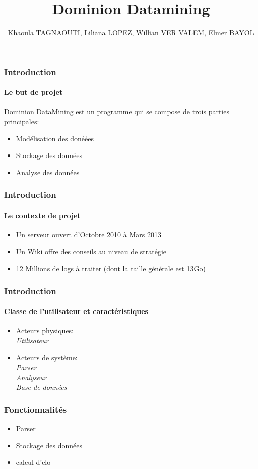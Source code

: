 \documentclass{beamer}
\title{Dominion Datamining}
\author[TAGNAOUTI, LOPEZ, VER VALEM, BAYOL]{Khaoula TAGNAOUTI, Liliana LOPEZ, Willian VER VALEM, Elmer BAYOL}
\begin{document}
\maketitle


\begin{frame}
  \frametitle{Introduction}
  \framesubtitle{Le but de projet}
  Dominion DataMining est un programme qui se compose de trois parties principales:
  \begin{itemize}
  \item Modélisation des donéées
  \item Stockage des données
  \item Analyse des données
  \end{itemize}
\end{frame}

\begin{frame}
  \frametitle{Introduction}
  \framesubtitle{Le contexte de projet}
  
  \begin{itemize}
    \item Un serveur ouvert d'Octobre 2010 à Mars 2013
    \item Un Wiki offre des conseils au niveau de stratégie
    \item 12 Millions de logs à traiter (dont la taille générale est 13Go)
  
  \end{itemize}

\end{frame}
\begin{frame}
  \frametitle{Introduction}
  \framesubtitle{Classe de l'utilisateur et caractéristiques}
 
  \begin{itemize}
    \item Acteurs physiques:
     ~~\\
     \textit{Utilisateur}
      ~~\\
    \item Acteurs de système:  
      ~~\\
     \textit{Parser}
       ~~\\
     \textit{Analyseur}
      ~~\\
     \textit{Base de données}
      ~~\\
     
  \end{itemize}

\end{frame}
  

\begin{frame}
  \frametitle{Fonctionnalités}
  \begin{itemize}
  \item Parser
  \item Stockage des données
  \item calcul d'elo
  \end{itemize}
\end{frame}
\end{document}
